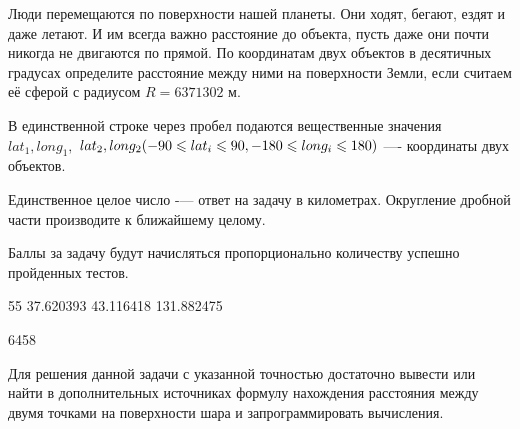 
Люди перемещаются по поверхности нашей планеты. Они ходят, бегают, ездят и даже летают. И им всегда важно расстояние до объекта, пусть даже они почти никогда не двигаются по прямой. По координатам двух объектов в десятичных градусах определите расстояние между ними на поверхности Земли, если считаем её сферой с радиусом $R = 6371302$ м.


В единственной строке через пробел подаются вещественные значения $ lat_1, long_1,$ \linebreak $lat_2, long_2 \space(-90 \leq lat_i \leq 90, -180 \leq long_i \leq 180) $ —- координаты двух объектов.

\outputfmtSection

Единственное целое число -— ответ на задачу в километрах. Округление дробной части производите к ближайшему целому.

\markSection

Баллы за задачу будут начисляться пропорционально количеству успешно пройденных тестов.


\begin{myverbbox}[\small]{\vinput}
    55 37.620393 43.116418 131.882475
\end{myverbbox}

\begin{myverbbox}[\small]{\voutput}
    6458
\end{myverbbox}

\solutionSection

Для решения данной задачи с указанной точностью достаточно вывести или найти в дополнительных источниках формулу нахождения расстояния между двумя точками на поверхности шара и запрограммировать вычисления.

